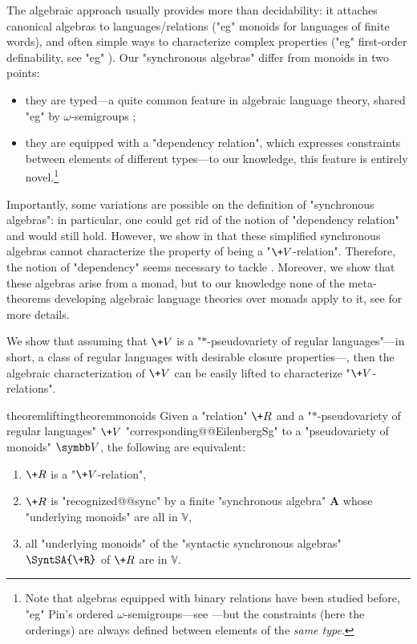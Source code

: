 The algebraic approach usually provides more than decidability: it attaches
canonical algebras to languages/relations ("eg" monoids for languages of finite words), and often simple ways to characterize complex properties ("eg" first-order definability, see "eg" \cite[Theorem 2.6, p.~40]{bojanczyk_languages_2020}).
Our "synchronous algebras" differ from monoids in two points:
\begin{itemize}
	\item they are typed---a quite common feature in algebraic language theory, shared "eg" by $\omega$-semigroups \cite[\S 4.1, p.~91]{perrin_infinite_2004};
	\item they are equipped with a "dependency relation", which expresses constraints between 
	elements of different types---to our knowledge, this feature is entirely novel.\footnote{Note that algebras equipped with binary relations have been studied before, "eg" Pin's ordered 
	$\omega$-semigroups---see \cite[\S 2.4, p.~7]{pin_positive_1998}---but the constraints (here the 
	orderings) are always defined between elements of the \emph{same type}.}
\end{itemize}

Importantly, some variations are possible on the definition of "synchronous algebras":
in particular, one could get rid of the notion of "dependency relation" and 
 would still hold.
However, we show in  that these
simplified synchronous algebras cannot characterize the property of being a "$\+V$-relation".
Therefore, the notion of "dependency" seems necessary to tackle .
Moreover, we show that these algebras arise from a monad, but to our knowledge none of the 
meta-theorems developing algebraic language theories over monads apply to it,
see  for more details.

We show that assuming that $\+V$ is a "$*$-pseudovariety of regular languages"---in short, a class of regular languages with desirable closure properties---, then the algebraic characterization of $\+V$ can be easily lifted to characterize "$\+V$-relations".

\begin{restatable*}{theorem}{liftingtheoremmonoids}
	\label{thm:lifting-theorem-monoids}
	Given a "relation" $\+R$ and a "$\ast$-pseudovariety of regular languages" $\+V$
	"corresponding@@EilenbergSg" to a "pseudovariety of monoids" $\B{V}$,
	the following are equivalent:
	\begin{enumerate}
		\item $\+R$ is a "$\+V$-relation",
		\item $\+R$ is "recognized@@sync" by a finite "synchronous algebra" $\mathbf{A}$
			whose "underlying monoids" are all in $\mathbb{V}$,
		\item all "underlying monoids" of the "syntactic synchronous algebras" $\SyntSA{\+R}$ of
			$\+R$ are in $\mathbb{V}$.
	\end{enumerate} 
\end{restatable*}

